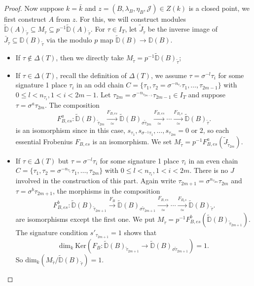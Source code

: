 \documentclass{article}
\begin{document}
\begin{proof}
Now suppose $k=\bar{k}$ and $z=(B,\lambda_B,\eta_B,\mathcal{J})\in Z(k)$ is a closed point, we first construct $A$ from $z$. For this, we will construct modules $\tilde{\mathbb{D}}(A)_{\tilde\tau}\subseteq M_{\tilde\tau}\subseteq p^{-1}\tilde{\mathbb{D}}(A)_{\tilde\tau}$. For $\tau\in I_T$, let $\tilde{J}_{\tilde\tau}$ be the inverse image of $\bar{J}_{\tilde\tau}\subseteq \mathbb{D}(B)_{\tilde\tau}$ via the modulo $p$ map $\tilde{\mathbb{D}}(B)\to\mathbb{D}(B)$.
\begin{itemize}
	\item If $\tau\notin \Delta(T)$, then we directly take $M_{\tilde\tau}=p^{-1}\tilde{\mathbb{D}}(B)_{\tilde\tau}$;
	\item If $\tau\in\Delta(T)$, recall the definition of $\Delta(T)$, we assume $\tau=\sigma^{-l}\tau_i$ for some signature 1 place $\tau_i$ in an odd chain $C=\{\tau_1,\tau_2=\sigma^{-n_{\tau_1}}\tau_1,\ldots,\tau_{2m-1}\}$ with $0\le l< n_{\tau_i},1<i<2m-1$. Let $\tau_{2m}=\sigma^{-n_{\tau_{2m-1}}}\tau_{2m-1}\in I_T$ and suppose $\tau=\sigma^a\tau_{2m}$. The composition
\begin{equation}
F^a_{B,es}:\tilde{\mathbb{D}}(B)_{\tilde\tau_{2m}}\xrightarrow[\simeq]{F_{B,es}}\tilde{\mathbb{D}}(B)_{\sigma\tilde\tau_{2m}}\xrightarrow[\simeq]{F_{B,es}}\cdots\xrightarrow[\simeq]{F_{B_es}}\tilde{\mathbb{D}}(B)_{\tilde\tau}.
\end{equation}
is an isomorphism since in this case, $s_{\tau_1},s_{\sigma^{-1}\tau_1},\ldots,s_{\tau_{2m}}=0$ or $2$, so each essential Frobenius $F_{B,es}$ is an isomorphism. We set $M_{\tilde\tau}=p^{-1}F_{B,es}^a(\tilde{J}_{\tilde\tau_{2m}})$.
	\item If $\tau\in\Delta(T)$ but $\tau=\sigma^{-l}\tau_i$ for some signature 1 place $\tau_i$ in an even chain $C=\{\tau_1,\tau_2=\sigma^{-n_{\tau_1}}\tau_1,\ldots,\tau_{2m}\}$ with $0\le l<n_{\tau_i},1<i<2m$. There is no $J$ involved in the construction of this part. Again write $\tau_{2m+1}=\sigma^{n_{\tau_{2m}}}\tau_{2m}$ and $\tau=\sigma^b\tau_{2m+1}$, the morphisms in the composition
\begin{equation}
F^b_{B,es}:\tilde{\mathbb{D}}(B)_{\tilde\tau_{2m+1}}\xrightarrow{F_{B}}\tilde{\mathbb{D}}(B)_{\sigma\tilde\tau_{2m+1}}\xrightarrow[\simeq]{F_{B,es}}\cdots\xrightarrow[\simeq]{F_{B_es}}\tilde{\mathbb{D}}(B)_{\tilde\tau}.
\end{equation}
are isomorphisms except the first one. We put $M_{\tilde\tau}=p^{-1}F^b_{B,es}(\tilde{\mathbb{D}}(B)_{\tilde\tau_{2m+1}})$. The signature condition $s'_{\tau_{2m+1}}=1$ shows that 
\begin{equation}
\text{dim}_k\ \text{Ker}(F_B:\tilde{\mathbb{D}}(B)_{\tilde\tau_{2m+1}}\to \tilde{\mathbb{D}}(B)_{\sigma\tilde\tau_{2m+1}})=1.
\end{equation}
So $\text{dim}_k(M_{\tilde\tau}/\tilde{\mathbb{D}}(B)_{\tilde\tau})=1$.
\end{itemize}


\end{proof}
\end{document}
